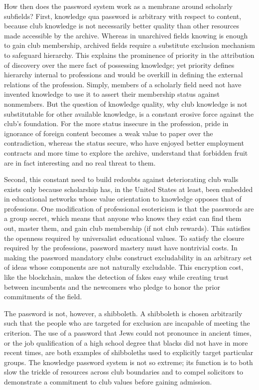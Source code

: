 \documentclass[]{book}
\theoremstyle{definition}
\theoremstyle{definition}
\theoremstyle{definition}
\theoremstyle{remark}
\begin{document}
How then does the password system work as a membrane around scholarly
subfields? First, knowledge qua password is arbitrary with respect to
content, because club knowledge is not necessarily better quality than
other resources made accessible by the archive. Whereas in unarchived
fields knowing is enough to gain club membership, archived fields
require a substitute exclusion mechanism to safeguard hierarchy. This
explains the prominence of priority in the attribution of discovery over
the mere fact of possessing knowledge; yet priority defines hierarchy
internal to professions and would be overkill in defining the external
relations of the profession. Simply, members of a scholarly field need
not have invented knowledge to use it to assert their membership status
against nonmembers. But the question of knowledge quality, why club
knowledge is not substitutable for other available knowledge, is a
constant erosive force against the club's foundation. For the more
status insecure in the profession, pride in ignorance of foreign content
becomes a weak value to paper over the contradiction, whereas the status
secure, who have enjoyed better employment contracts and more time to
explore the archive, understand that forbidden fruit are in fact
interesting and no real threat to them.

Second, this constant need to build redoubts against deteriorating club
walls exists only because scholarship has, in the United States at
least, been embedded in educational networks whose value orientation to
knowledge opposes that of professions. One modification of professional
esotericism is that the passwords are a group secret, which means that
anyone who knows they exist can find them out, master them, and gain
club membership (if not club rewards). This satisfies the openness
required by universalist educational values. To satisfy the closure
required by the professions, password mastery must have nontrivial
costs. In making the password mandatory clubs construct excludability in
an arbitrary set of ideas whose components are not naturally excludable.
This encryption cost, like the blockchain, makes the detection of fakes
easy while creating trust between incumbents and the newcomers who
pledge to honor the prior commitments of the field.

The password is not, however, a shibboleth. A shibboleth is chosen
arbitrarily such that the people who are targeted for exclusion are
incapable of meeting the criterion. The use of a password that Jews
could not pronounce in ancient times, or the job qualification of a high
school degree that blacks did not have in more recent times, are both
examples of shibboleths used to explicitly target particular groups. The
knowledge password system is not so extreme; its function is to both
slow the trickle of resources across club boundaries and to compel
solicitors to demonstrate a commitment to club values before gaining
admission.
\end{document}

